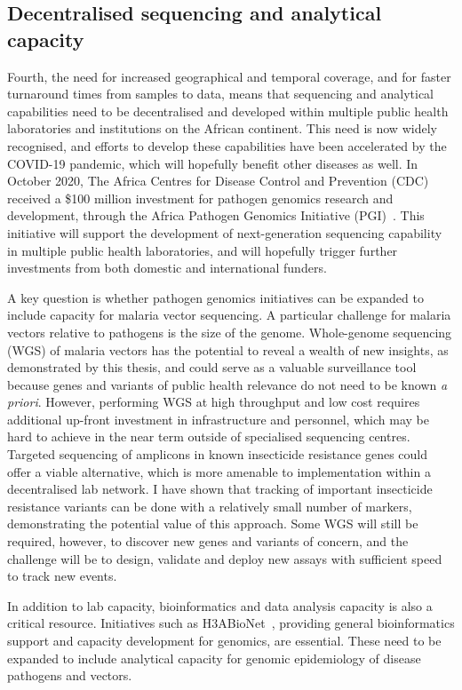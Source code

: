 \documentclass[a4paper,11pt,abstracton,hidelinks]{scrartcl}
\begin{document}
\subsection{Decentralised sequencing and analytical capacity}


Fourth, the need for increased geographical and temporal coverage, and for faster turnaround times from samples to data, means that sequencing and analytical capabilities need to be decentralised and developed within multiple public health laboratories and institutions on the African continent.
%
This need is now widely recognised, and efforts to develop these capabilities have been accelerated by the COVID-19 pandemic, which will hopefully benefit other diseases as well.
%
In October 2020, The Africa Centres for Disease Control and Prevention (CDC) received a \$100 million investment for pathogen genomics research and development, through the Africa Pathogen Genomics Initiative (PGI)~\parencite{Makoni2020}.
%
This initiative will support the development of next-generation sequencing capability in multiple public health laboratories, and will hopefully trigger further investments from both domestic and international funders.


A key question is whether pathogen genomics initiatives can be expanded to include capacity for malaria vector sequencing.
%
A particular challenge for malaria vectors relative to pathogens is the size of the genome.
%
Whole-genome sequencing (WGS) of malaria vectors has the potential to reveal a wealth of new insights, as demonstrated by this thesis, and could serve as a valuable surveillance tool because genes and variants of public health relevance do not need to be known \textit{a priori}.
%
However, performing WGS at high throughput and low cost requires additional up-front investment in infrastructure and personnel, which may be hard to achieve in the near term outside of specialised sequencing centres.
%
Targeted sequencing of amplicons in known insecticide resistance genes could offer a viable alternative, which is more amenable to implementation within a decentralised lab network.
%
I have shown that tracking of important insecticide resistance variants can be done with a relatively small number of markers, demonstrating the potential value of this approach.
%
Some WGS will still be required, however, to discover new genes and variants of concern, and the challenge will be to design, validate and deploy new assays with sufficient speed to track new events.


In addition to lab capacity, bioinformatics and data analysis capacity is also a critical resource.
%
Initiatives such as H3ABioNet~\parencite{Kumuthini2019}, providing general bioinformatics support and capacity development for genomics, are essential.
%
These need to be expanded to include analytical capacity for genomic epidemiology of disease pathogens and vectors.
\end{document}
